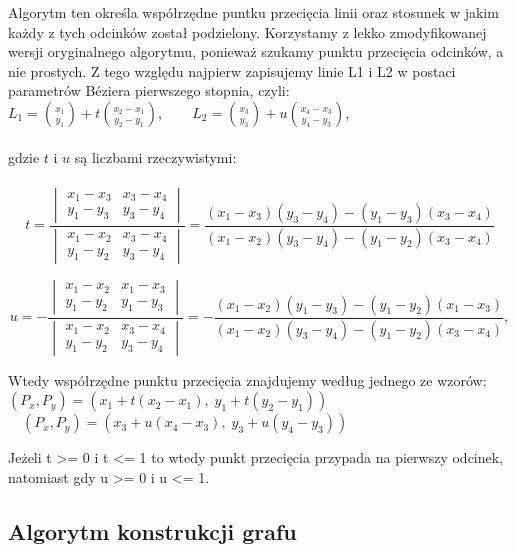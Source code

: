 \documentclass{article}
\begin{document}
Algorytm ten określa współrzędne puntku przecięcia linii oraz stosunek w jakim każdy z tych odcinków został podzielony. Korzystamy z lekko zmodyfikowanej wersji oryginalnego algorytmu, ponieważ szukamy punktu przecięcia odcinków, a nie prostych. Z tego względu najpierw zapisujemy linie L1 i L2 w postaci parametrów Béziera pierwszego stopnia, czyli:\\
${\displaystyle L_{1}={x_{1} \choose y_{1}}+t{x_{2}-x_{1} \choose y_{2}-y_{1}},\qquad L_{2}={x_{3} \choose y_{3}}+u{x_{4}-x_{3} \choose y_{4}-y_{3}}}$,\\
\\
gdzie $t$ i $u$ są liczbami rzeczywistymi:\\
\\
$${{\displaystyle t={\frac {\begin{vmatrix}x_{1}-x_{3}&x_{3}-x_{4}\\y_{1}-y_{3}&y_{3}-y_{4}\end{vmatrix}}{\begin{vmatrix}x_{1}-x_{2}&x_{3}-x_{4}\\y_{1}-y_{2}&y_{3}-y_{4}\end{vmatrix}}}={\frac {(x_{1}-x_{3})(y_{3}-y_{4})-(y_{1}-y_{3})(x_{3}-x_{4})}{(x_{1}-x_{2})(y_{3}-y_{4})-(y_{1}-y_{2})(x_{3}-x_{4})}}}}$$

 $${\displaystyle u=-{\frac {\begin{vmatrix}x_{1}-x_{2}&x_{1}-x_{3}\\y_{1}-y_{2}&y_{1}-y_{3}\end{vmatrix}}{\begin{vmatrix}x_{1}-x_{2}&x_{3}-x_{4}\\y_{1}-y_{2}&y_{3}-y_{4}\end{vmatrix}}}=-{\frac {(x_{1}-x_{2})(y_{1}-y_{3})-(y_{1}-y_{2})(x_{1}-x_{3})}{(x_{1}-x_{2})(y_{3}-y_{4})-(y_{1}-y_{2})(x_{3}-x_{4})}},}$$


Wtedy współrzędne punktu przecięcia znajdujemy według jednego ze wzorów: 
${\displaystyle (P_{x},P_{y})=(x_{1}+t(x_{2}-x_{1}),\;y_{1}+t(y_{2}-y_{1}))}\quad $\\
$\displaystyle\quad (P_{x},P_{y})=(x_{3}+u(x_{4}-x_{3}),\;y_{3}+u(y_{4}-y_{3}))\quad$

Jeżeli t >= 0 i t <= 1 to wtedy punkt przecięcia przypada na pierwszy odcinek, natomiast gdy u >= 0 i u <= 1.
\subsection{Algorytm konstrukcji grafu}
\label{algo_graphconstr}
\end{document}
